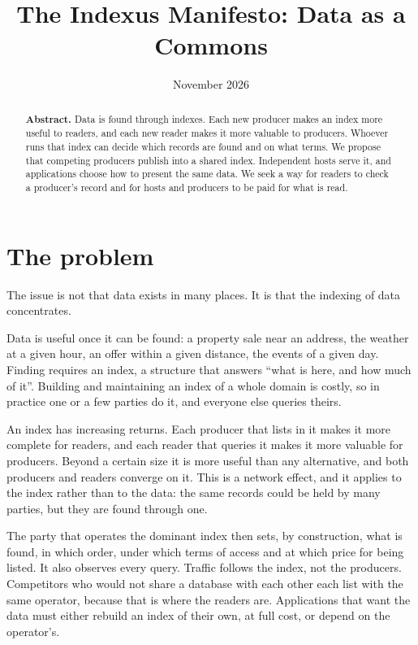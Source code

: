 \documentclass[11pt]{article}
\begin{document}
\title{The Indexus Manifesto: Data as a Commons}
\author{\ixbyline}
\date{November 2026}

\maketitle

\begin{abstract}
\noindent \textbf{Abstract. }Data is found through indexes. Each new producer makes an index more useful to readers, and each new reader makes it more valuable to producers. Whoever runs that index can decide which records are found and on what terms. We propose that competing producers publish into a shared index. Independent hosts serve it, and applications choose how to present the same data. We seek a way for readers to check a producer's record and for hosts and producers to be paid for what is read.
\vspace{1em}\end{abstract}

\section*{The problem}
The issue is not that data exists in many places. It is that the indexing of data concentrates.

Data is useful once it can be found: a property sale near an address, the weather at a given hour, an offer within a given distance, the events of a given day. Finding requires an index, a structure that answers ``what is here, and how much of it''. Building and maintaining an index of a whole domain is costly, so in practice one or a few parties do it, and everyone else queries theirs.

An index has increasing returns. Each producer that lists in it makes it more complete for readers, and each reader that queries it makes it more valuable for producers. Beyond a certain size it is more useful than any alternative, and both producers and readers converge on it. This is a network effect, and it applies to the index rather than to the data: the same records could be held by many parties, but they are found through one.

The party that operates the dominant index then sets, by construction, what is found, in which order, under which terms of access and at which price for being listed. It also observes every query. Traffic follows the index, not the producers. Competitors who would not share a database with each other each list with the same operator, because that is where the readers are. Applications that want the data must either rebuild an index of their own, at full cost, or depend on the operator's.
\end{document}

